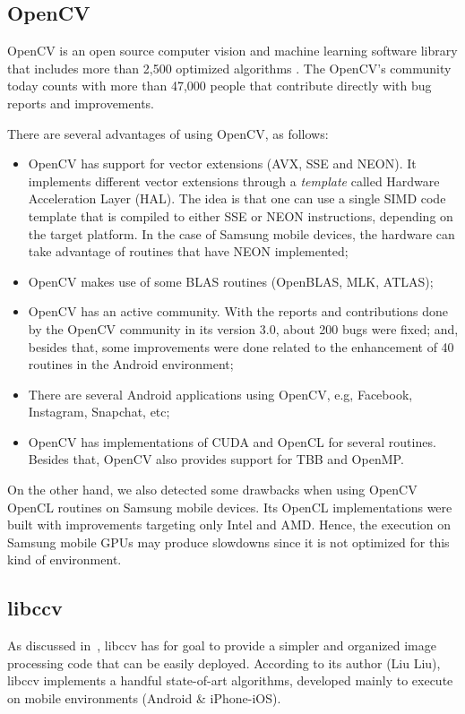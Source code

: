 \documentclass[12pt, fleqn]{article}
\begin{document}
\subsection{OpenCV}
OpenCV is an open source computer vision and machine learning software library that includes more than 2,500 optimized algorithms \cite{opencv}. The OpenCV's community today counts with more than 47,000 people that contribute directly with bug reports and improvements.

There are several advantages of using OpenCV, as follows:
\begin{itemize}
	\item OpenCV has support for vector extensions (AVX, SSE and NEON). It implements different vector extensions through a \textit{template} called Hardware Acceleration Layer (HAL). The idea is that one can use a single SIMD  code template that is compiled to either SSE or NEON instructions, depending on the target platform. In the case of Samsung mobile devices, the hardware can take advantage of  routines that have NEON implemented;
	\item OpenCV makes use of some BLAS routines (OpenBLAS, MLK, ATLAS);
	\item OpenCV has an active community. With the reports and contributions done by the OpenCV community in its version 3.0, about 200 bugs 	were fixed; and, besides that, some improvements were done related to the enhancement of 40 routines in the  Android environment;
	\item There are several Android applications using OpenCV, e.g, Facebook, Instagram, Snapchat, etc;
	\item OpenCV has implementations of CUDA and OpenCL for several routines. Besides that, OpenCV also provides support for TBB and 
	OpenMP.
\end{itemize}

On the other hand, we also detected some drawbacks when using  OpenCV OpenCL routines on Samsung mobile devices. Its  OpenCL implementations were built with improvements targeting only Intel and AMD. Hence, the execution on Samsung mobile GPUs may produce slowdowns since it is not optimized for this kind of environment.

\subsection{libccv}
As discussed in~\cite{ccv},  libccv has for goal to provide  a simpler and organized image processing code that can be easily deployed. According to its author (Liu Liu),  libccv implements a handful state-of-art algorithms,  developed mainly to execute on mobile environments (Android \& iPhone-iOS).
\end{document}

